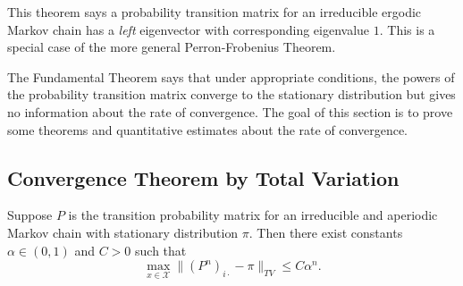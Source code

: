 \documentclass[12pt]{article}
\begin{document}
\begin{remark}
    This theorem says a probability transition matrix for an irreducible
    ergodic Markov chain has a \emph{left} eigenvector with
    corresponding eigenvalue \( 1 \).  This is a special case of the
    more general Perron-Frobenius Theorem.
\end{remark}

\begin{remark}
    The Fundamental Theorem says that under appropriate conditions, the
    powers of the probability transition matrix converge to the
    stationary distribution but gives no information about the rate of
    convergence.  The goal of this section is to prove some theorems and
    quantitative estimates about the rate of convergence.
\end{remark}

\subsection*{Convergence Theorem by Total Variation}

\begin{theorem}
    Suppose \( P \) is the transition probability matrix for an
    irreducible and aperiodic Markov chain with stationary distribution \(
    \pi \).  Then there exist constants \( \alpha \in (0,1) \) and \( C
    > 0 \) such that
    \[
        \max_{x \in \mathcal{X}} \| (P^n)_{i \cdot} - \pi \|_{TV} \le C
        \alpha^n.
    \]
\end{theorem}
\end{document}
